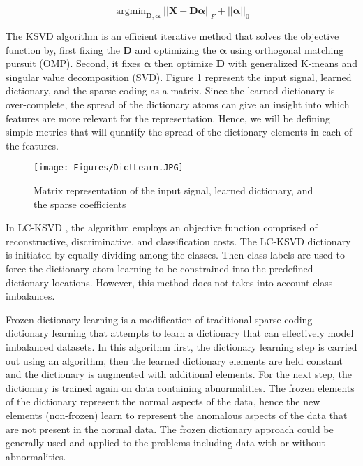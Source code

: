 \documentclass[11pt]{article}
\DeclareMathOperator*{\argmin}{argmin}
\begin{document}
\begin{equation}
    \label{eq:sparse}
    \argmin_{\mathbf{D},\bm{\alpha}} ||\mathbf{\bar{X}}- \mathbf{D}\bm{\alpha}||_F + ||\bm{\alpha}||_0
\end{equation}

The KSVD algorithm is an efficient iterative method that solves the objective function by, first fixing the $\mathbf{D}$ and optimizing the $\bm{\alpha}$ using orthogonal matching pursuit (OMP)\cite{Pati1993}. Second, it fixes $\bm{\alpha}$ then optimize $\mathbf{D}$ with generalized K-means and singular value decomposition (SVD). Figure \ref{fig: DictLearn} represent the input signal, learned dictionary, and the sparse coding as a matrix. Since the learned dictionary is over-complete, the spread of the dictionary atoms can give an insight into which features are more relevant for the representation. Hence, we will be defining simple metrics that will quantify the spread of the dictionary elements in each of the features. 

\begin{figure}
    \centering
    \texttt{[image: Figures/DictLearn.JPG]}
    \caption{Matrix representation of the input signal, learned dictionary, and the sparse coefficients}
    \label{fig: DictLearn}
\end{figure}

In LC-KSVD \cite{Jiang2011}, the algorithm employs an objective function comprised of reconstructive, discriminative, and classification costs. The LC-KSVD dictionary is initiated by equally dividing among the classes. Then class labels are used to force the dictionary atom learning to be constrained into the predefined dictionary locations. However, this method does not takes into account class imbalances.

Frozen dictionary learning is a modification of traditional sparse coding dictionary learning that attempts to learn a dictionary that can effectively model imbalanced datasets\cite{Carroll2017}. In this algorithm first, the dictionary learning step is carried out using an algorithm, then the learned dictionary elements are held constant and the dictionary is augmented with additional elements. For the next step, the dictionary is trained again on data containing abnormalities. The frozen elements of the dictionary represent the normal aspects of the data, hence the new elements (non-frozen) learn to represent the anomalous aspects of the data that are not present in the normal data. The frozen dictionary approach could be generally used and applied to the problems including data with or without abnormalities. 
\end{document}

